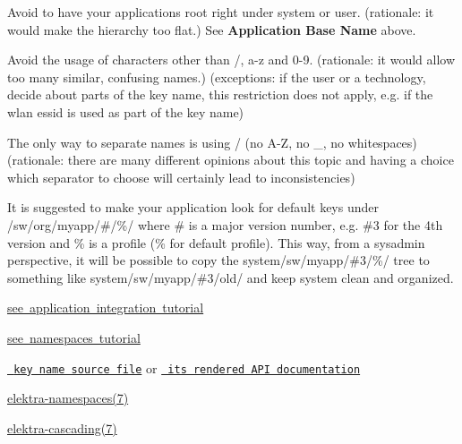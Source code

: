\begin{DoxyItemize}
\item Avoid to have your applications root right under {\ttfamily system} or {\ttfamily user}. (rationale\+: it would make the hierarchy too flat.) See {\bfseries{Application Base Name}} above.
\item Avoid the usage of characters other than {\ttfamily /}, a-\/z and 0-\/9. (rationale\+: it would allow too many similar, confusing names.) (exceptions\+: if the user or a technology, decide about parts of the key name, this restriction does not apply, e.\+g. if the wlan essid is used as part of the key name)
\item The only way to separate names is using {\ttfamily /} (no A-\/Z, no {\ttfamily \+\_\+}, no whitespaces) (rationale\+: there are many different opinions about this topic and having a choice which separator to choose will certainly lead to inconsistencies)
\item It is suggested to make your application look for default keys under {\ttfamily /sw/org/myapp/\#/\%/} where {\ttfamily \#} is a major version number, e.\+g. {\ttfamily \#3} for the 4th version and {\ttfamily \%} is a profile ({\ttfamily \%} for default profile). This way, from a sysadmin perspective, it will be possible to copy the {\ttfamily system/sw/myapp/\#3/\%/} tree to something like {\ttfamily system/sw/myapp/\#3/old/} and keep system clean and organized.
\end{DoxyItemize}


\begin{DoxyItemize}
\item \mbox{\hyperlink{doc_tutorials_application-integration_md}{see application integration tutorial}}
\item \mbox{\hyperlink{doc_tutorials_namespaces_md}{see namespaces tutorial}}
\item \href{/home/mpranj/workspace/libelektra/src/libs/elektra/keyname.c}{\texttt{ key name source file}} or \href{https://doc.libelektra.org/api/latest/html/group__keyname.html\#details}{\texttt{ its rendered A\+PI documentation}}
\item \mbox{\hyperlink{doc_help_elektra-namespaces_md}{elektra-\/namespaces(7)}}
\item \mbox{\hyperlink{doc_help_elektra-cascading_md}{elektra-\/cascading(7)}} 
\end{DoxyItemize}